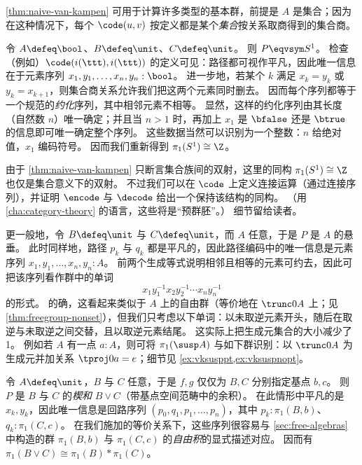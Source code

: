 %

\cref{thm:naive-van-kampen} 可用于计算许多类型的基本群，前提是 $A$ 是集合；因为在这种情况下，每个 $\code(u,v)$ 按定义都是某个\emph{集合}按关系取商得到的集合商。

\begin{eg}\label{eg:circle}
  令 $A\defeq \bool$、$B\defeq\unit$、$C\defeq \unit$。
  则 $P \eqvsym S^1$。
  检查（例如）$\code(i(\ttt),i(\ttt))$ 的定义可见：路径都可视作平凡，因此唯一信息在于元素序列 $x_1,y_1,\dots,x_n,y_n: \bool$。
  进一步地，若某个 $k$ 满足 $x_k=y_k$ 或 $y_k=x_{k+1}$，则集合商关系允许我们把这两个元素同时删去。
  因而每个序列都等于一个规范的\emph{约化}序列，其中相邻元素不相等。
  显然，这样的约化序列由其长度（自然数 $n$）唯一确定；并且当 $n>1$ 时，再加上 $x_1$ 是 $\bfalse$ 还是 $\btrue$ 的信息即可唯一确定整个序列。
  这些数据当然可以识别为一个整数：$n$ 给绝对值，$x_1$ 编码符号。
  因而我们重新得到 $\pi_1(S^1)\cong \Z$。
\end{eg}

由于 \cref{thm:naive-van-kampen} 只断言集合族间的双射，这里的同构 $\pi_1(S^1)\cong \Z$ 也仅是集合意义下的双射。
不过我们可以在 $\code$ 上定义连接运算（通过连接序列），并证明 $\encode$ 与 $\decode$ 给出一个保持该结构的同构。
（用 \cref{cha:category-theory} 的语言，这些将是“预群胚”。）
细节留给读者。

%

\begin{eg}\label{eg:suspension}
  更一般地，令 $B\defeq\unit$ 与 $C\defeq \unit$，而 $A$ 任意，于是 $P$ 是 $A$ 的悬垂。
  此时同样地，路径 $p_k$ 与 $q_k$ 都是平凡的，因此路径编码中的唯一信息是元素序列 $x_1,y_1,\dots,x_n,y_n: A$。
  前两个生成等式说明相邻且相等的元素可约去，因此可把该序列看作群中的单词
  \[ x_1 y_1^{-1} x_2 y_2^{-1} \cdots x_n y_n^{-1} \]
  的形式。
  的确，这看起来类似于 $A$ 上的自由群（等价地在 $\trunc0A$ 上；见 \cref{thm:freegroup-nonset}），但我们只考虑以下单词：以未取逆元素开头，随后在取逆与未取逆之间交替，且以取逆元素结尾。
  这实际上把生成元集合的大小减少了 1。
  例如若 $A$ 有一点 $a:A$，则可将 $\pi_1(\susp A)$ 与如下群识别：以 $\trunc0A$ 为生成元并加关系 $\tproj0a = e$；细节见 \cref{ex:vksusppt,ex:vksuspnopt}。
\end{eg}

\begin{eg}\label{eg:wedge}
  令 $A\defeq\unit$，$B$ 与 $C$ 任意，于是 $f,g$ 仅仅为 $B,C$ 分别指定基点 $b,c$。
  则 $P$ 是 $B$ 与 $C$ 的\emph{楔和} $B\vee C$（带基点空间范畴中的余积）。
  在此情形中平凡的是 $x_k,y_k$，因此唯一信息是回路序列 $(p_0,q_1,p_1,\dots,p_n)$，其中 $p_k:\pi_1(B,b)$、$q_k:\pi_1(C,c)$。
  在我们施加的等价关系下，这些序列很容易与 \cref{sec:free-algebras} 中构造的群 $\pi_1(B,b)$ 与 $\pi_1(C,c)$ 的\emph{自由积}的显式描述对应。
  因而有 $\pi_1(B\vee C) \cong \pi_1(B) * \pi_1(C)$。
\end{eg}

